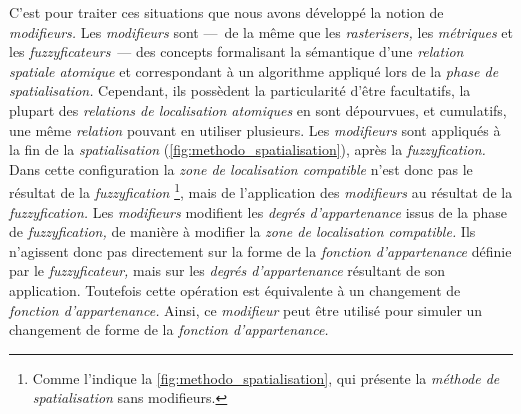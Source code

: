 C'est pour traiter ces situations que nous avons développé la notion
de \emph{modifieurs.} Les \emph{modifieurs} sont ---~de la même que
les \emph{rasterisers,} les \emph{métriques} et les
\emph{fuzzyficateurs}~--- des concepts formalisant la sémantique d'une
\emph{relation spatiale atomique} et correspondant à un algorithme
appliqué lors de la \emph{phase de spatialisation.} Cependant, ils
possèdent la particularité d'être facultatifs, la plupart des
\emph{relations de localisation atomiques} en sont dépourvues, et
cumulatifs, une même \emph{relation} pouvant en utiliser
plusieurs. Les \emph{modifieurs} sont appliqués à la fin de la
\emph{spatialisation} (\autoref{fig:methodo_spatialisation}), après la
\emph{fuzzyfication.}  Dans cette configuration la \emph{zone de
  localisation compatible} n'est donc pas le résultat de la
\emph{fuzzyfication} \footnote{Comme l'indique la
  \autoref{fig:methodo_spatialisation}, qui présente la \emph{méthode
    de spatialisation} sans modifieurs.}, mais de l’application des
\emph{modifieurs} au résultat de la \emph{fuzzyfication.} Les
\emph{modifieurs} modifient les \emph{degrés d'appartenance} issus de
la phase de \emph{fuzzyfication,} de manière à modifier la \emph{zone
  de localisation compatible.} Ils n'agissent donc pas directement sur
la forme de la \emph{fonction d'appartenance} définie par le
\emph{fuzzyficateur,} mais sur les \emph{degrés d'appartenance}
résultant de son application. Toutefois cette opération est
équivalente à un changement de \emph{fonction d'appartenance.} Ainsi,
ce \emph{modifieur} peut être utilisé pour simuler un changement de
forme de la \emph{fonction d'appartenance.}

